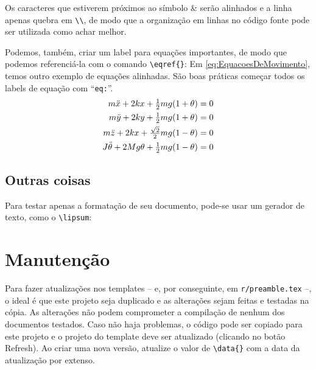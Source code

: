 \documentclass[brazilian, 11pt, oneside, a4paper]{article}
\begin{document}
Os caracteres que estiverem próximos ao símbolo \& serão alinhados e a linha apenas quebra em \verb$\\$, de modo que a organização em linhas no código fonte pode ser utilizada como achar melhor.

Podemos, também, criar um label para equações importantes, de modo que podemos referenciá-la com o comando \verb$\eqref{}$: Em \eqref{eq:EquacoesDeMovimento}, temos outro exemplo de equações alinhadas. São boas práticas começar todos os labels de equação com ``\verb$eq:$''.
\begin{equation}\label{eq:EquacoesDeMovimento}
    \begin{aligned}
        m\Ddot{x}+2kx+\tfrac{1}{2}mg(1+\theta) &= 0 \\
        m\Ddot{y}+2ky+\tfrac{1}{2}mg(1+\theta) &= 0 \\
        m\Ddot{z}+2kx+\tfrac{\sqrt{2}}{2}mg(1-\theta) &= 0 \\
        J\Ddot{\theta}+2Mg\theta+\tfrac{1}{2}mg(1-\theta) &= 0 
    \end{aligned}
\end{equation}

\subsection{Outras coisas}
Para testar apenas a formatação de seu documento, pode-se usar um gerador de texto, como o \verb$\lipsum$: \\
\lipsum[1-2]

\section{Manutenção}\label{sec:Manutencao}

Para fazer atualizações nos templates -- e, por conseguinte, em \verb$r/preamble.tex$ --, o ideal é que este projeto seja duplicado e as alterações sejam feitas e testadas na cópia. As alterações não podem comprometer a compilação de nenhum dos documentos testados. Caso não haja problemas, o código pode ser copiado para este projeto e o projeto do template deve ser atualizado (clicando no botão Refresh). Ao criar uma nova versão, atualize o valor de \verb$\data{}$ com a data da atualização por extenso.
\end{document}
